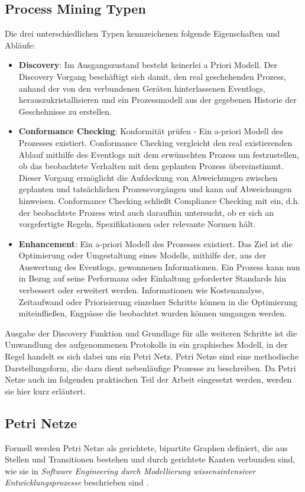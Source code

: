\newpage
\subsection{Process Mining Typen}
Die drei unterschiedlichen Typen kennzeichenen folgende Eigenschaften und Abläufe:
\begin{itemize}
\item \textbf{Discovery}: Im Ausgangszustand besteht keinerlei a Priori Modell. Der Discovery Vorgang beschäftigt sich damit, den real geschehenden Prozess, anhand der von den verbundenen Geräten hinterlassenen Eventlogs, herauszukristallisieren und ein Prozessmodell aus der gegebenen Historie der Geschehnisse zu erstellen.

\item \textbf{Conformance Checking}: Konformität prüfen - Ein a-priori Modell des Prozesses existiert. Conformance Checking vergleicht den real existierenden Ablauf mithilfe des Eventlogs mit dem erwünschten Prozess um festzustellen, ob das beobachtete Verhalten mit dem geplanten Prozess übereinstimmt. Dieser Vorgang ermöglicht die Aufdeckung von Abweichungen zwischen geplanten und tatsächlichen Prozessvorgängen und kann auf Abweichungen hinweisen.  Conformance Checking schließt Compliance Checking mit ein, d.h. der beobachtete Prozess wird auch daraufhin untersucht, ob er sich an vorgefertigte Regeln, Spezifikationen oder relevante Normen hält.

\item \textbf{Enhancement}: Ein a-priori Modell des Prozesses existiert. Das Ziel ist die Optimierung oder Umgestaltung eines Modells, mithilfe der, aus der Auswertung des Eventlogs, gewonnenen Informationen. Ein Prozess kann nun in Bezug auf seine Performanz oder Einhaltung geforderter Standards hin verbessert oder erweitert werden. Informationen wie Kostenanalyse, Zeitaufwand oder Priorisierung einzelner Schritte können in die Optimierung miteinfließen, Engpässe die beobachtet  wurden können umgangen werden.
\end{itemize}

Ausgabe der Discovery Funktion und Grundlage für alle weiteren Schritte ist die Umwandlung des aufgenommenen Protokolls in ein graphisches Modell, in der Regel handelt es sich dabei um ein Petri Netz. Petri Netze sind eine methodische Darstellungsform, die dazu dient nebenläufige Prozesse zu beschreiben. Da Petri Netze auch im folgenden praktischen Teil der Arbeit eingesetzt werden, werden sie hier kurz erläutert. 

\subsection{Petri Netze}
Formell werden Petri Netze als gerichtete, bipartite Graphen definiert, die aus Stellen  und  Transitionen  bestehen und durch  gerichtete  Kanten  verbunden sind, wie sie in \textit{Software Engineering durch Modellierung wissensintensiver Entwicklungsprozesse} beschrieben sind \cite{freund2007software}. 

